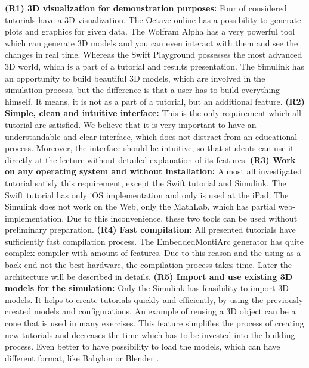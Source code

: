 \textbf{(R1) 3D visualization for demonstration purposes:} Four of considered tutorials have a 3D visualization. The Octave online has a possibility to generate plots and graphics for given data. The Wolfram Alpha has a very powerful tool which can generate 3D models and you can even interact with them and see the changes in real time. Whereas the Swift Playground possesses the most advanced 3D world, which is a part of a tutorial and results presentation. The Simulink has an opportunity to build beautiful 3D models, which are involved in the simulation process, but the difference is that a user has to build everything himself. It means, it is not as a part of a tutorial, but an additional feature.\newline
\textbf{(R2) Simple, clean and intuitive interface:} This is the only requirement which all tutorial are satisfied. We believe that it is very important to have an understandable and clear interface, which does not distract from an educational process. Moreover, the interface should be intuitive, so that students can use it directly at the lecture without detailed explanation of its features.\newline
\textbf{(R3) Work on any operating system and without installation:} Almost all investigated tutorial satisfy this requirement, except the Swift tutorial and Simulink. The Swift tutorial has only iOS implementation and only is used at the iPad. The Simulink does not work on the Web, only the MathLab, which has partial web-implementation. Due to this inconvenience, these two tools can be used without preliminary preparation.\newline
\textbf{(R4) Fast compilation:} All presented tutorials have sufficiently fast compilation process. The EmbeddedMontiArc generator has quite complex compiler with amount of features. Due to this reason and the using as a back end not the best hardware, the compilation process takes time. Later the architecture will be described in details.\newline
\textbf{(R5) Import and use existing 3D models for the simulation:} Only the Simulink has feasibility to import 3D models. It helps to create tutorials quickly and efficiently, by using the previously created models and configurations. An example of reusing a 3D object can be a cone that is used in many exercises. This feature simplifies the process of creating new tutorials and decreases the time which has to be invested into the building process. Even better to have possibility to load the models, which can have different format, like Babylon \cite{Babylon} or Blender \cite{Blender}. \newline
